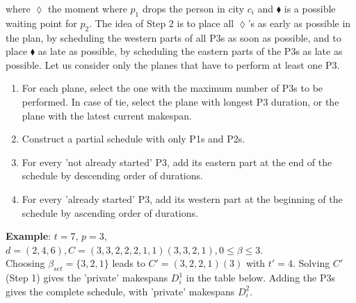 \documentclass{llncs}
\begin{document}
where $\lozenge$ the moment where $p_1$ drops the person in city $c_i$ and $\blacklozenge$ is a possible waiting point for $p_2$. 
The idea of Step 2 is to place all $\lozenge$'s as early as possible in the plan, by scheduling the  western parts of all P3s as soon as possible, and to place $\blacklozenge$ as late as possible, by scheduling the eastern parts of the P3s as late as possible.
Let us consider only the planes that have to perform at least one P3.

\begin{enumerate}
\item For each plane, select the one with the maximum number of P3s to be performed. In case of tie, select the plane with longest P3 duration, or the plane with the latest current makespan.
\item Construct a partial schedule with only P1s and P2s. 
\item For every 'not already started' P3, add its eastern part at the end of the schedule by descending order of durations.
\item For every 'already started' P3, add its western part at the beginning of the schedule by ascending order of durations. 
\end{enumerate}

\noindent
{\bf Example}: $t=7$, $p=3$, $d=(2,4,6), C = (3,3,2,2,2,1,1)(3,3,2,1), 0 \leq \beta \leq 3$.\\
Choosing $\beta_{set} = \{3,2,1\}$ leads to $C' = (3,2,2,1)(3)$ with $t'=4$. Solving $C'$ (Step 1) gives the 'private' makespans $D^1_i$ in the table below. Adding the P3s gives the complete schedule, with 'private' makespans $D^2_i$.\\

\end{document}
